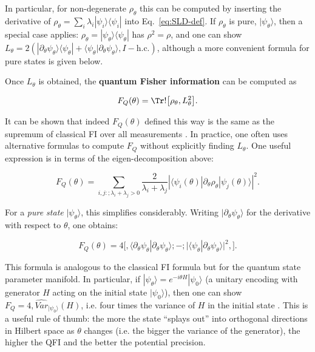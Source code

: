 In particular, for non-degenerate $\rho_\theta$ this can be computed
by inserting the derivative of $\rho_\theta = \sum_i \lambda_i
|\psi_i\rangle\langle\psi_i|$ into Eq.~\eqref{eq:SLD-def}. If
$\rho_\theta$ is pure, $|\psi_\theta\rangle$, then a special case
applies: $\rho_\theta = |\psi_\theta\rangle\langle\psi_\theta|$ has
$\rho^2=\rho$, and one can show $L_\theta = 2(|\partial_\theta
\psi_\theta\rangle\langle \psi_\theta| + \langle
\psi_\theta|\partial_\theta \psi_\theta\rangle, I - \text{h.c.})$,
although a more convenient formula for pure states is given below.



Once $L_\theta$ is obtained, the \textbf{quantum Fisher information} can be computed as

\begin{equation}
F_Q(\theta) = \Tr!\big[\rho_\theta, L_\theta^2\big].
\label{eq:QFI-def}
\end{equation}

It can be shown that indeed $F_Q(\theta)$ defined this way is the same
as the supremum of classical FI over all measurements
\cite{Helstrom1976, Holevo2011, BraunsteinCaves1994}. In practice, one
often uses alternative formulas to compute $F_Q$ without explicitly
finding $L_\theta$. One useful expression is in terms of the
eigen-decomposition above:

\begin{equation}
F_Q(\theta) = \sum_{i,j:; \lambda_i + \lambda_j >0} \frac{2}{\lambda_i + \lambda_j} \left|\langle \psi_i(\theta)|\partial_\theta \rho_\theta|\psi_j(\theta)\rangle\right|^2.
\label{eq:QFI-eigen}
\end{equation}

For a \textit{pure state} $|\psi_\theta\rangle$, this simplifies
considerably. Writing $|\partial_\theta \psi_\theta\rangle$ for the
derivative with respect to $\theta$, one obtains:

\begin{equation}
F_Q(\theta) = 4 \Big[, \langle \partial_\theta \psi_\theta | \partial_\theta \psi_\theta \rangle ;-; \big|\langle \psi_\theta | \partial_\theta \psi_\theta \rangle\big|^2,\Big].
\label{eq:QFI-pure}
\end{equation}

This formula is analogous to the classical FI formula but for the
quantum state parameter manifold. In particular, if
$|\psi_\theta\rangle = e^{-i\theta H}|\psi_0\rangle$ (a unitary
encoding with generator $H$ acting on the initial state
$|\psi_0\rangle$), then one can show $F_Q =
4,\widehat{Var}_{|\psi_0\rangle}(H)$, i.e. four times the variance of $H$ in
the initial state \cite{BraunsteinCaves1994, Paris2009}. This is a
useful rule of thumb: the more the state “splays out” into orthogonal
directions in Hilbert space as $\theta$ changes (i.e. the bigger the
variance of the generator), the higher the QFI and the better the
potential precision.



